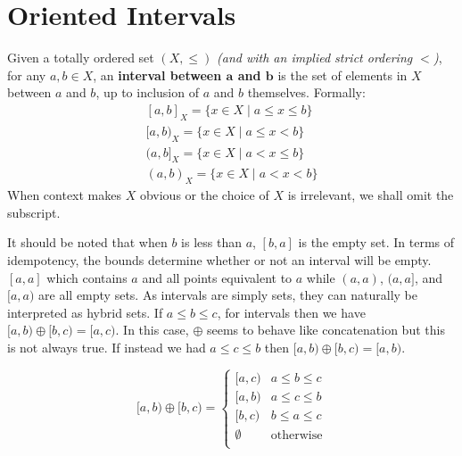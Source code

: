 %
%

\section{Oriented Intervals}
\label{sec:OrientedIntervals}

\begin{definition}
	Given a totally ordered set $(X, \leq)$ \emph{(and with an implied strict ordering $<$)}, 
	for any $a,b \in X$, an \textbf{interval between $\boldsymbol{a}$ and $\boldsymbol{b}$} 
	is the set of elements in $X$ between $a$ and $b$, up to inclusion of $a$ and $b$ themselves. 
	Formally:
	\begin{equation} 
	\begin{array}{cc}
		{[a,b]}_X =  \{ x \in X \;|\; a \leq x \leq b \} \\
		{[a,b)}_X =  \{ x \in X \;|\; a \leq x < b \} \\
		{(a,b]}_X =  \{ x \in X \;|\; a < x \leq b \} \\
		{(a,b)}_X =  \{ x \in X \;|\; a < x < b \}
	\end{array} 
	\end{equation}
	When context makes $X$ obvious or the choice of $X$ is irrelevant, we shall omit the subscript.
\end{definition}

It should be noted that when $b$ is less than $a$, $[b,a]$ is the empty set. 
In terms of idempotency, the bounds determine whether or not an interval will be empty.
$[a,a]$ which contains $a$ and all points equivalent to $a$ while $(a,a)$, $(a,a]$, and $[a,a)$ are all empty sets.
As intervals are simply sets, they can naturally be interpreted as hybrid sets.
If $a \leq b \leq c$, for intervals then we have $[a,b) \oplus [b,c) = [a,c)$.
In this case, $\oplus$ seems to behave like concatenation but this is not always true.
If instead we had $a \leq c \leq b$ then $[a,b) \oplus [b,c) = [a,b)$.

\begin{equation*}
	[a,b) \oplus [b,c) =
	\begin{cases}
		[a,c) & a \leq b \leq c \\
		[a,b) & a \leq c \leq b \\
		[b,c) & b \leq a \leq c \\
		\emptyset & \text{otherwise} \\
	\end{cases}
\end{equation*}


